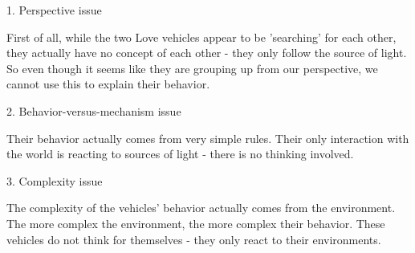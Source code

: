 \documentclass[a4paper,10pt]{article}
\begin{document}
  1. Perspective issue
  \par
    First of all, while the two Love vehicles appear to be 'searching' for each other, they actually have
    no concept of each other - they only follow the source of light. So even though it seems like they are
    grouping up from our perspective, we cannot use this to explain their behavior.

  2. Behavior-versus-mechanism issue
  \par
    Their behavior actually comes from very simple rules. Their only interaction with the world is reacting
    to sources of light - there is no thinking involved.

  3. Complexity issue
  \par
    The complexity of the vehicles' behavior actually comes from the environment. The more complex the
    environment, the more complex their behavior. These vehicles do not think for themselves - they only
    react to their environments.
\end{document}
